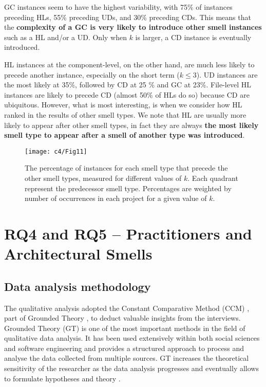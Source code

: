 GC instances seem to have the highest variability, with 75\% of instances preceding HLs, 55\% preceding UDs, and 30\% preceding CDs.
This means that the \textbf{complexity of a GC is very likely to introduce other smell instances} such as a HL and/or a UD.
Only when $k$ is larger, a CD instance is eventually introduced.

HL instances at the component-level, on the other hand, are much less likely to precede another instance, especially on the short term ($k \le 3$). UD instances are the most likely at 35\%, followed by CD at 25 \% and GC at 23\%.
File-level HL instances are likely to precede CD (almost 50\% of HLs do so) because CD are ubiquitous.
However, what is most interesting, is when we consider how HL ranked in the results of other smell types. 
We note that HL are usually more likely to appear after other smell types, in fact they are always \textbf{the most likely smell type to appear after a smell of another type was introduced}.


\begin{figure}
    \centering
    \texttt{[image: c4/Fig11]}
    \caption{The percentage of instances for each smell type that precede the other smell types, measured for different values of $k$. Each quadrant represent the predecessor smell type. Percentages are weighted by number of occurrences in each project for a given value of $k$.}\label{c4:fig:precedence}
\end{figure}

\section{RQ4 and RQ5 -- Practitioners and Architectural Smells}\label{c4:sec:rq-4-and-5}
\subsection{Data analysis methodology}\label{c4:sec:methodology-rq-4-and-5}
The qualitative analysis adopted the Constant Comparative Method (CCM) \cite{Glaser2017, Boeije2002}, part of Grounded Theory \cite{Glaser1968}, to deduct valuable insights from the interviews. Grounded Theory (GT) is one of the most important methods in the field of qualitative data analysis. It has been used extensively within both social sciences and software engineering and provides a structured approach to process and analyse the data collected from multiple sources. GT increases the theoretical sensitivity of the researcher as the data analysis progresses and eventually allows to formulate hypotheses and theory \cite{Glaser1968}.

